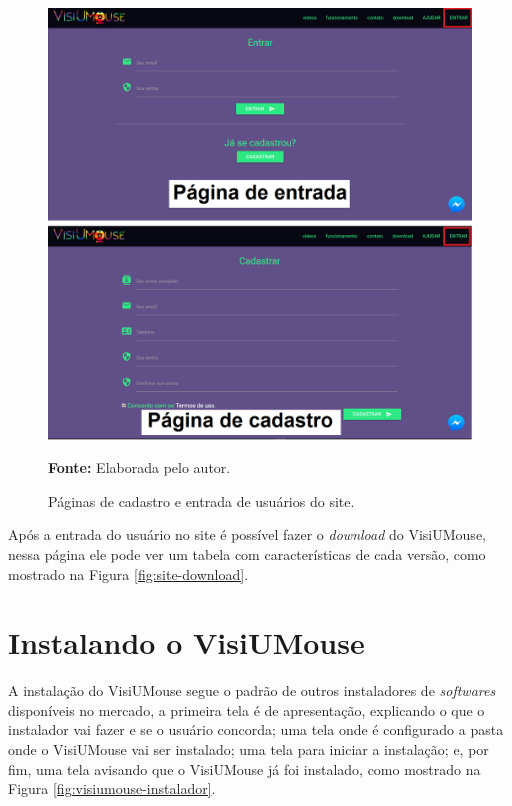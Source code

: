 \begin{figure}[H]
\caption{Páginas de cadastro e entrada de usuários do site.} 
\centering \includegraphics[scale=0.45]{img/site-entrar.png}

{\fontsize{11}{11}\selectfont \textbf{Fonte:} Elaborada pelo autor.}
\label{fig:site-entrar}
\end{figure}

Após a entrada do usuário no site é possível fazer o \textit{download} do VisiUMouse, nessa página ele pode ver um tabela com características de cada versão, como mostrado na Figura \ref{fig:site-download}.


\section{Instalando o VisiUMouse}
A instalação do VisiUMouse segue o padrão de outros instaladores de \textit{softwares} disponíveis no mercado, a primeira tela é de apresentação, explicando o que o instalador vai fazer e se o usuário concorda; uma tela onde é configurado a pasta onde o VisiUMouse vai ser instalado; uma tela para iniciar a instalação; e, por fim, uma tela avisando que o VisiUMouse já foi instalado, como mostrado na Figura \ref{fig:visiumouse-instalador}.

